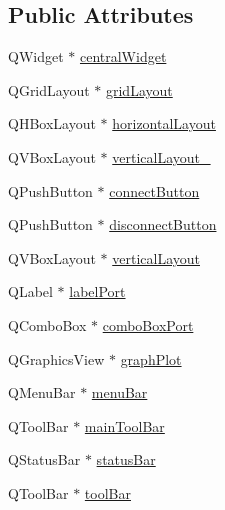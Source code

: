 \subsection*{Public Attributes}
\begin{DoxyCompactItemize}
\item 
Q\-Widget $\ast$ \hyperlink{class_ui___main_window_a30075506c2116c3ed4ff25e07ae75f81}{central\-Widget}
\item 
Q\-Grid\-Layout $\ast$ \hyperlink{class_ui___main_window_a525ed3c5fe0784ac502ee222fba4e205}{grid\-Layout}
\item 
Q\-H\-Box\-Layout $\ast$ \hyperlink{class_ui___main_window_acd6fdc9ebacc4b25b834162380d75ce8}{horizontal\-Layout}
\item 
Q\-V\-Box\-Layout $\ast$ \hyperlink{class_ui___main_window_a0c01bad60d9f422a1258e710635a2f65}{vertical\-Layout\-\_}
\item 
Q\-Push\-Button $\ast$ \hyperlink{class_ui___main_window_a2be0aeea6aafd9452b68be78669c2703}{connect\-Button}
\item 
Q\-Push\-Button $\ast$ \hyperlink{class_ui___main_window_af9bea8f9fa6502089441800bf095a7be}{disconnect\-Button}
\item 
Q\-V\-Box\-Layout $\ast$ \hyperlink{class_ui___main_window_aecd96a04789fcfec3f98d80390ad8184}{vertical\-Layout}
\item 
Q\-Label $\ast$ \hyperlink{class_ui___main_window_a5b07c23cfb9e49ae640e58c604d3e118}{label\-Port}
\item 
Q\-Combo\-Box $\ast$ \hyperlink{class_ui___main_window_a9bff57744bbf4e66df1a44b618cb4e36}{combo\-Box\-Port}
\item 
Q\-Graphics\-View $\ast$ \hyperlink{class_ui___main_window_a0d0388e1a183d7607f9cc82786e96e55}{graph\-Plot}
\item 
Q\-Menu\-Bar $\ast$ \hyperlink{class_ui___main_window_a2be1c24ec9adfca18e1dcc951931457f}{menu\-Bar}
\item 
Q\-Tool\-Bar $\ast$ \hyperlink{class_ui___main_window_a5172877001c8c7b4e0f6de50421867d1}{main\-Tool\-Bar}
\item 
Q\-Status\-Bar $\ast$ \hyperlink{class_ui___main_window_a50fa481337604bcc8bf68de18ab16ecd}{status\-Bar}
\item 
Q\-Tool\-Bar $\ast$ \hyperlink{class_ui___main_window_ab84dc49349f514d7b7d3fe8e78de069b}{tool\-Bar}
\end{DoxyCompactItemize}


